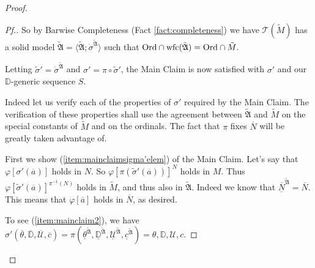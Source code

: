 \documentclass{amsart}
\theoremstyle{definition}
\theoremstyle{remark}
\newcommand{\D}{\mathbb{D}}
\newcommand{\N}{{\overline{N}}}
\newcommand{\U}{\mathcal{U}}
\newcommand{\Ord}{\textup{\ensuremath{\text{Ord}}}}
\begin{document}
\begin{proof}
\begin{proof}[Pf.]
So by Barwise Completeness (Fact \ref{fact:completeness}) we have $\mathcal T(\tilde M)$ has a solid model $\tilde{\mathfrak A} = \langle \tilde{\mathfrak A}; \dot{\sigma}^{\tilde{\mathfrak A}} \rangle$ such that $\text{Ord} \cap \text{wfc}(\tilde{\mathfrak A}) = \Ord \cap \tilde M.$

Letting $\tilde \sigma' = \dot{\sigma}^{\tilde{\mathfrak A}}$ and $\sigma'=\pi \circ \tilde \sigma'$, the Main Claim is now satisfied with $\sigma'$ and our $\D$-generic sequence $S$.

Indeed let us verify each of the properties of $\sigma'$ required by the Main Claim. The verification of these properties shall use the agreement between $\tilde{\mathfrak A}$ and $\tilde M$ on the special constants of $\tilde M$ and on the ordinals. The fact that $\pi$ fixes $\N$ will be greatly taken advantage of.

First we show (\ref{item:mainclaimsigma'elem}) of the Main Claim. Let's say that $\varphi[\sigma'(\overline a)]$ holds in $N$. So $\varphi[\pi(\tilde \sigma'(\overline a))]^N$ holds in $M$. Thus $\varphi[\tilde \sigma'(\overline a)]^{\pi^{-1}(N)}$ holds in $\tilde M$, and thus also in $\tilde{\mathfrak A}$. Indeed we know that $\underline{\N}^{\tilde{\mathfrak A}} = \N$.
This means that $\varphi[\overline a]$ holds in $\N$, as desired.

To see (\ref{item:mainclaim2}), we have $\sigma'(\overline \theta, \overline{\D}, \overline{\U}, \overline c)= \pi(\underline{\theta}^{\tilde{\mathfrak A}}, \underline{\D}^{\tilde{\mathfrak A}}, \underline{\U}^{\tilde{\mathfrak A}}, \underline{c}^{\tilde{\mathfrak A}})=\theta, \D, \U, c$.


\end{proof}
\end{proof}
\end{document}
